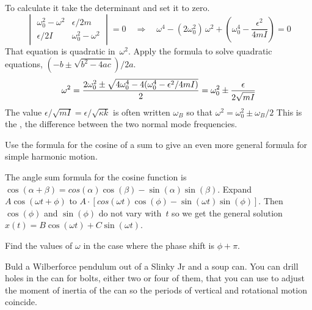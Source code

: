 To calculate it
take the determinant and set it to zero.
\begin{equation*}
  \begin{vmatrix}
    \omega_0^2-\omega^2    &\epsilon/2m  \\
    \epsilon/2I           &\omega_0^2-\omega^2     
  \end{vmatrix}=0
  \quad\Longrightarrow\quad
  \omega^4-(2\omega_0^2)\,\omega^2
      +(\omega_0^4 -\frac{\epsilon^2}{4mI})=0
\end{equation*}
That equation is quadratic in~$\omega^2$.  
Apply the formula to solve quadratic equations, $(-b\pm\sqrt{b^2-4ac})/2a$.
\begin{equation*}   %
  \omega^2 
  =\frac{2\omega_0^2
       \pm\sqrt{\smash[b]{\strut} 4\omega_0^4
                -4(\omega_0^4-\epsilon^2/4mI)}}{2}
  =\omega_0^2\pm\frac{\epsilon}{2\sqrt{mI}}
\end{equation*}
The value $\epsilon/\sqrt{mI}=\epsilon/\sqrt{\kappa k}$ is often written
$\omega_B$ so that
$
  \omega^2 =\omega_0^2\pm\omega_B/2
$
This is the , the difference
between the two normal mode frequencies.

\begin{exercises}
\item Use the formula for the cosine of a sum to give an even more
  general formula for simple harmonic motion.
  \begin{answer}
    The angle sum formula for the cosine function is 
    $\cos(\alpha+\beta)=cos(\alpha)\cos(\beta)-\sin(\alpha)\sin(\beta)$.
    Expand $A\cos(\omega t+\phi)$ to
    $A\cdot[cos(\omega t)\cos(\phi)-\sin(\omega t)\sin(\phi)]$.
    Then $\cos(\phi)$ and $\sin(\phi)$ do not vary with~$t$ so we get
    the general solution $x(t)=B\cos(\omega t)+C\sin(\omega t)$.
  \end{answer}
\item Find the values of $\omega$ in the case where the phase shift 
  is $\phi+\pi$.
\item Buld a Wilberforce pendulum out of a Slinky Jr and a soup can.
  You can drill holes in the can for bolts, either two or four of them,
  that you can use to adjust
  the moment of inertia of the can so the periods of vertical and rotational 
  motion coincide.
\end{exercises}
\endinput
% 